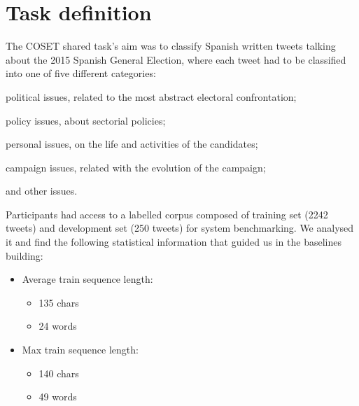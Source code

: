 \section{Task definition} \label{sec:task}

The COSET shared task's aim was to classify Spanish written tweets talking about the 2015 Spanish General Election, where each tweet had to be classified into one of five different categories:
\begin{enumerate*}
\item political issues, related to the most abstract electoral confrontation; 
\item policy issues, about sectorial policies; 
\item personal issues, on the life and activities of the candidates; 
\item campaign issues, related with the evolution of the campaign;
\item and other issues.
\end{enumerate*}

Participants had access to a labelled corpus composed of training set (2242 tweets) and development set (250 tweets) for system benchmarking. We analysed it and find the following statistical information that guided us in the baselines building:
\begin{multicols}{2}
\begin{itemize}
	\item Average train sequence length:
	\begin{itemize}
		\item 135 chars 
		\item 24 words
	\end{itemize}
	\item Max train sequence length: 
	\begin{itemize}
		\item 140 chars
		\item 49 words
	\end{itemize}
\end{itemize}
\end{multicols}